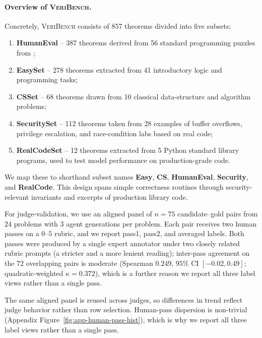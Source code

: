 \documentclass{article}
\begin{document}
\paragraph{Overview of \textsc{VeriBench}.}
Concretely, \textsc{VeriBench} consists of 857 theorems divided into five subsets:
\begin{enumerate}
  \item \textbf{HumanEval} -- 387 theorems derived from 56 standard programming puzzles from \citet{chen2021evaluating};
  \item \textbf{EasySet} -- 278 theorems extracted from 41 introductory logic and programming tasks;
  \item \textbf{CSSet} -- 68 theorems drawn from 10 classical data-structure and algorithm problems;
  \item \textbf{SecuritySet} -- 112 theorems taken from 28 examples of buffer overflows, privilege escalation, and race-condition labs based on real code;
  \item \textbf{RealCodeSet} -- 12 theorems extracted from 5 Python standard library programs, used to test model performance on production-grade code.
\end{enumerate}
We map these to shorthand subset names \textbf{Easy}, \textbf{CS}, \textbf{HumanEval}, \textbf{Security}, and \textbf{RealCode}. This design spans simple correctness routines through security-relevant invariants and excerpts of production library code.

For judge-validation, we use an aligned panel of \(n=75\) candidate--gold pairs from \(24\) problems with \(3\) agent generations per problem. Each pair receives two human passes on a \(0\)--\(5\) rubric, and we report pass1, pass2, and averaged labels.
Both passes were produced by a single expert annotator under two closely related rubric prompts (a stricter and a more lenient reading); inter-pass agreement on the \(72\) overlapping pairs is moderate (Spearman \(0.249\), \(95\%\) CI \([-0.02, 0.49]\); quadratic-weighted \(\kappa = 0.372\)), which is a further reason we report all three label views rather than a single pass.

The same aligned panel is reused across judges, so differences in trend reflect judge behavior rather than row selection. Human-pass dispersion is non-trivial (Appendix Figure~\ref{fig:app-human-pass-hist}), which is why we report all three label views rather than a single pass.
\end{document}
